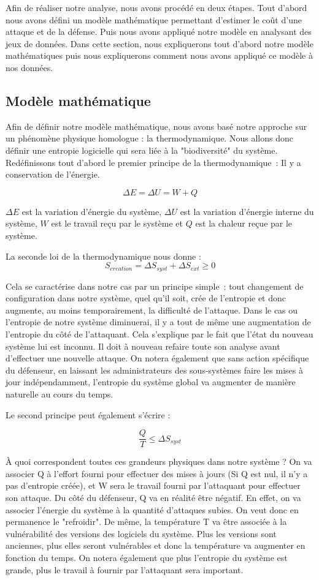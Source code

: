 Afin de réaliser notre analyse, nous avons procédé en deux étapes.
Tout d'abord nous avons défini un modèle mathématique permettant d'estimer le coût d'une attaque et de la défense.
Puis nous avons appliqué notre modèle en analysant des jeux de données.
Dans cette section, nous expliquerons tout d'abord notre modèle mathématiques puis nous expliquerons comment nous avons appliqué ce modèle à nos données.

\subsection{Modèle mathématique}\label{sec:modelMath}

Afin de définir notre modèle mathématique, nous avons basé notre approche sur un phénomène physique homologue : la thermodynamique.
Nous allons donc définir une entropie logicielle qui sera liée à la "biodiversité" du système.
Redéfinissons tout d'abord le premier principe de la thermodynamique~: Il y a conservation de l'énergie. 

\[
\Delta E = \Delta U = W + Q
\]

$\Delta E$ est la variation d'énergie du système, $\Delta U$ est la variation d'énergie interne du système, $W$ est le travail reçu par le système et $Q$ est la chaleur reçue par le système.

La seconde loi de la thermodynamique nous donne :
\[
S_{creation} = \Delta S_{syst} + \Delta S_{ext} \geq 0
\]

Cela se caractérise dans notre cas par un principe simple~: tout changement de configuration dans notre système, quel qu'il soit, crée de l'entropie et donc augmente, au moins temporairement, la difficulté de l'attaque.
Dans le cas ou l'entropie de notre système diminuerai, il y a tout de même une augmentation de l'entropie du côté de l'attaquant. Cela s'explique par le fait que l'état du nouveau système lui est inconnu. Il doit à nouveau refaire toute son analyse avant d'effectuer une nouvelle attaque. On notera également que sans action spécifique du défenseur, en laissant les administrateurs des sous-systèmes faire les mises à jour indépendamment, l'entropie du système global va augmenter de manière naturelle au cours du temps. 

Le second principe peut également s'écrire :

\[
\frac{Q}{T} \leq \Delta S_{syst}
\]

À quoi correspondent toutes ces grandeurs physiques dans notre système ? On va associer Q à l'effort fourni pour effectuer des mises à jours (Si Q est nul, il n'y a pas d'entropie créée), et W sera le travail fourni par l'attaquant pour effectuer son attaque. Du côté du défenseur, Q va en réalité être négatif. En effet, on va associer l'énergie du système à la quantité d'attaques subies. On veut donc en permanence le "refroidir".
De même, la température T va être associée à la vulnérabilité des versions des logiciels du système. Plus les versions sont anciennes, plus elles seront vulnérables et donc la température va augmenter en fonction du temps.
On notera également que plus l'entropie du système est grande, plus le travail à fournir par l'attaquant sera important.



